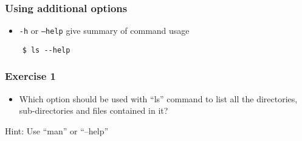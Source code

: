 \documentclass[12pt,compress]{beamer}
\begin{document}
\begin{frame}[fragile]
  \frametitle{Using additional options}

  \begin{itemize}
  \item \texttt{-h} or \texttt{--help} give summary of command usage
  \end{itemize}
  \begin{lstlisting}
    $ ls --help
  \end{lstlisting} %
\end{frame}

\begin{frame}
  \frametitle{Exercise 1}
  \begin{itemize}
  \item Which option should be used with ``ls'' command to list all the directories,
        sub-directories and files contained in it? 
  \end{itemize}
        Hint: Use ``man'' or ``--help''
\end{frame}
\end{document}
